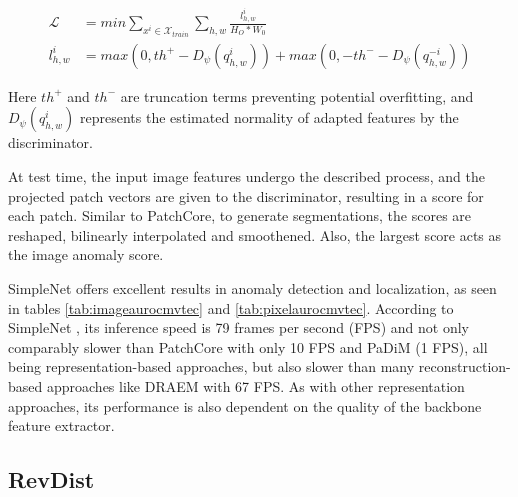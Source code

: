 \begin{equation}
 \label{eq:simplenetloss}
 \begin{split}
 \mathcal{L} &= min \sum_{x^{i}\in \mathcal{X}_{train}} \sum_{h, w} \frac{l^{i}_{h,w}}{H_{O} * W_{0}} \\
 l^{i}_{h,w} &= max(0, th^{+} - D_{\psi}(q^{i}_{h,w})) + max(0, -th^{-} - D_{\psi}(q^{-i}_{h,w}))
 \end{split}
\end{equation} 

Here $th^{+}$ and $th^{-}$ are truncation terms preventing potential overfitting, and $D_{\psi}(q^{i}_{h,w})$ represents the estimated normality of adapted features by the discriminator.

At test time, the input image features undergo the described process, and the projected patch vectors are given to the discriminator, resulting in a score for each patch. Similar to 
PatchCore, to generate segmentations, the scores are reshaped, bilinearly interpolated and smoothened. Also, the largest score acts as the image anomaly score.

SimpleNet offers excellent results in anomaly detection and localization, as seen in tables \ref{tab:imageaurocmvtec} and \ref{tab:pixelaurocmvtec}. According to SimpleNet \cite{liu2023simplenet}, its inference speed is 79 frames per second (FPS) and 
not only comparably slower than PatchCore \cite{patchCore2022} with only 10 FPS 
and PaDiM \cite{Defard_2021PADIM} (1 FPS), all being representation-based approaches, but also slower than many reconstruction-based approaches like DRAEM \cite{Zavrtanik_2021DRAEM} with 67 FPS. As with other representation 
approaches, its performance is also dependent on the quality of the backbone feature extractor.


\subsection{RevDist}
\label{subsec:revdist}

